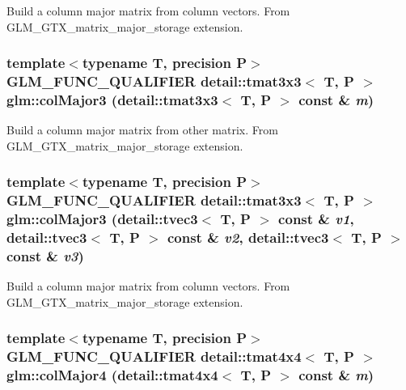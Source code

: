 Build a column major matrix from column vectors. From GLM\_\-GTX\_\-matrix\_\-major\_\-storage extension. \hypertarget{group__gtx__matrix__major__storage_g645e8b3708b02ae2ca1c4f3048f8f32a}{
\subsubsection[colMajor3]{\setlength{\rightskip}{0pt plus 5cm}template$<$typename T, precision P$>$ GLM\_\-FUNC\_\-QUALIFIER detail::tmat3x3$<$ T, P $>$ glm::colMajor3 (detail::tmat3x3$<$ T, P $>$ const \& {\em m})}}
\label{group__gtx__matrix__major__storage_g645e8b3708b02ae2ca1c4f3048f8f32a}


Build a column major matrix from other matrix. From GLM\_\-GTX\_\-matrix\_\-major\_\-storage extension. \hypertarget{group__gtx__matrix__major__storage_gfa499e4dd0fe76587feea1f3ad8dcfef}{
\subsubsection[colMajor3]{\setlength{\rightskip}{0pt plus 5cm}template$<$typename T, precision P$>$ GLM\_\-FUNC\_\-QUALIFIER detail::tmat3x3$<$ T, P $>$ glm::colMajor3 (detail::tvec3$<$ T, P $>$ const \& {\em v1}, \/  detail::tvec3$<$ T, P $>$ const \& {\em v2}, \/  detail::tvec3$<$ T, P $>$ const \& {\em v3})}}
\label{group__gtx__matrix__major__storage_gfa499e4dd0fe76587feea1f3ad8dcfef}


Build a column major matrix from column vectors. From GLM\_\-GTX\_\-matrix\_\-major\_\-storage extension. \hypertarget{group__gtx__matrix__major__storage_g85020709c53f89466c5135114e85d34a}{
\subsubsection[colMajor4]{\setlength{\rightskip}{0pt plus 5cm}template$<$typename T, precision P$>$ GLM\_\-FUNC\_\-QUALIFIER detail::tmat4x4$<$ T, P $>$ glm::colMajor4 (detail::tmat4x4$<$ T, P $>$ const \& {\em m})}}
\label{group__gtx__matrix__major__storage_g85020709c53f89466c5135114e85d34a}


